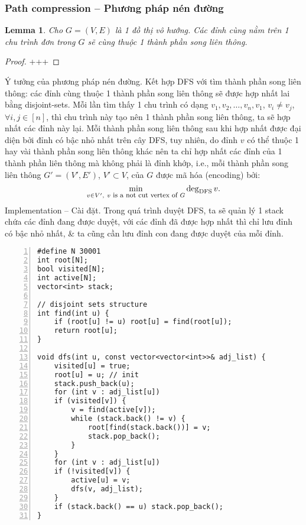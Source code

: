 \documentclass{article}
\newtheorem{lemma}{Lemma}
\begin{document}

\subsubsection{Path compression -- Phương pháp nén đường}

\begin{lemma}
    Cho $G = (V,E)$ là 1 đồ thị vô hướng. Các đỉnh cùng nằm trên 1 chu trình đơn trong $G$ sẽ cùng thuộc 1 thành phần song liên thông.
\end{lemma}

\begin{proof}
    +++
\end{proof}
{\sf Ý tưởng của phương pháp nén đường.} Kết hợp DFS với tìm thành phần song liên thông: các đỉnh cùng thuộc 1 thành phần song liên thông sẽ được hợp nhất lai bằng disjoint-sets. Mỗi lần tìm thấy 1 chu trình có dạng $v_1,v_2,\ldots,v_n,v_1$, $v_i\ne v_j$, $\forall i,j\in[n]$, thì chu trình này tạo nên 1 thành phần song liên thông, ta sẽ hợp nhất các đỉnh này lại. Mỗi thành phần song liên thông sau khi hợp nhất được đại diện bởi đỉnh có bậc nhỏ nhất trên cây DFS, tuy nhiên, do đỉnh $v$ có thể thuộc 1 hay vài thành phần song liên thông khác nên ta chỉ hợp nhất các đỉnh của 1 thành phần liên thông mà không phải là đỉnh khớp, i.e., mỗi thành phần song liên thông $G' = (V',E')$, $V'\subset V$, của $G$ được mã hóa (encoding) bởi:
\begin{equation*}
    \min_{v\in V',\ v\mbox{\footnotesize\ is a not cut vertex of } G} \deg_{\rm DFS} v.
\end{equation*}
{\sf Implementation -- Cài đặt.} Trong quá trình duyệt DFS, ta sẽ quản lý 1 stack chứa các đỉnh đang được duyệt, với các đỉnh đã được hợp nhất thì chỉ lưu đỉnh có bậc nhỏ nhất, \& ta cũng cần lưu đỉnh con đang được duyệt của mỗi đỉnh.
\begin{Verbatim}[numbers=left,xleftmargin=5mm]
#define N 30001
int root[N];
bool visited[N];
int active[N];
vector<int> stack;

// disjoint sets structure
int find(int u) {
    if (root[u] != u) root[u] = find(root[u]);
    return root[u];
}

void dfs(int u, const vector<vector<int>>& adj_list) {
    visited[u] = true;
    root[u] = u; // init
    stack.push_back(u);
    for (int v : adj_list[u])
    if (visited[v]) {
        v = find(active[v]);
        while (stack.back() != v) {
            root[find(stack.back())] = v;
            stack.pop_back();
        }
    }
    for (int v : adj_list[u])
    if (!visited[v]) {
        active[u] = v;
        dfs(v, adj_list);
    }
    if (stack.back() == u) stack.pop_back();
}
\end{Verbatim}
\end{document}
